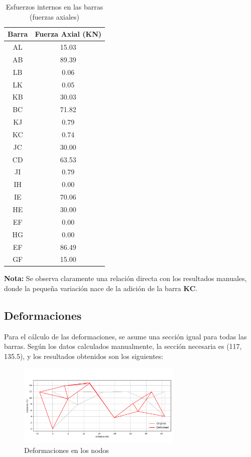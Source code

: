 \begin{table}[H]
    \centering
    \caption{Esfuerzos internos en las barras (fuerzas axiales)}
    \label{tab:esfuerzos_internos}
    \begin{tabular}{|c|c|}
        \hline
        \textbf{Barra} & \textbf{Fuerza Axial (KN)} \\
        \hline
        AL & 15.03 \\
        AB & 89.39 \\
        LB & 0.06  \\
        LK & 0.05  \\
        KB & 30.03 \\
        BC & 71.82 \\
        KJ & 0.79  \\
        KC & 0.74  \\
        JC & 30.00 \\
        CD & 63.53 \\
        JI & 0.79  \\
        IH & 0.00  \\
        IE & 70.06 \\
        HE & 30.00 \\
        EF & 0.00  \\
        HG & 0.00  \\
        EF & 86.49 \\
        GF & 15.00 \\ \hline
    \end{tabular}
\end{table}

\textbf{Nota:} Se observa claramente una relación directa con los resultados manuales, donde la pequeña variación nace de la adición de la barra \textbf{KC}.

\subsection{Deformaciones}

Para el cálculo de las deformaciones, se asume una sección igual para todas las barras. Según los datos calculados manualmente, la sección necesaria es (117, 135.5), y los resultados obtenidos son los siguientes:

\begin{figure}[H]
    \centering
    \includegraphics[width=0.7\textwidth]{GRAFICOS/deformed_truss.png}
    \caption{Deformaciones en los nodos}
    \label{fig:deformaciones}
\end{figure}

